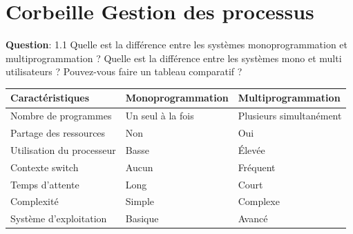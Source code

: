 \section*{Corbeille Gestion des processus}

\noindent \textbf{Question}: 1.1 Quelle est la différence entre les systèmes monoprogrammation et multiprogrammation ? Quelle est la différence entre les systèmes mono et multi utilisateurs ? Pouvez-vous faire un tableau comparatif ?

\vspace{0.5cm}

\begin{center}
\setlength{\tabcolsep}{10pt}

\begin{tabular}{|p{}|p{}|p{}|}
\hline
\textbf{Caractéristiques} & \textbf{Monoprogrammation} & \textbf{Multiprogrammation} \\ \hline

Nombre de programmes & Un seul à la fois & Plusieurs simultanément \\ \hline

Partage des ressources & Non & Oui \\ \hline

Utilisation du processeur & Basse & Élevée \\ \hline

Contexte switch & Aucun & Fréquent \\ \hline

Temps d'attente & Long & Court \\ \hline

Complexité & Simple & Complexe \\ \hline

Système d'exploitation & Basique & Avancé \\ \hline

\end{tabular}
\end{center}

\vspace{0.5cm}

